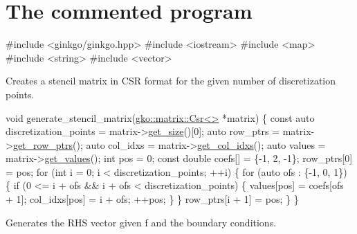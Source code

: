 \label{_CommProg}%
 \section*{The commented program}


\begin{DoxyCode}
\textcolor{preprocessor}{#include <ginkgo/ginkgo.hpp>}
\textcolor{preprocessor}{#include <iostream>}
\textcolor{preprocessor}{#include <map>}
\textcolor{preprocessor}{#include <string>}
\textcolor{preprocessor}{#include <vector>}
\end{DoxyCode}


Creates a stencil matrix in C\+SR format for the given number of discretization points.


\begin{DoxyCode}
\textcolor{keywordtype}{void} generate\_stencil\_matrix(\hyperlink{classgko_1_1matrix_1_1Csr}{gko::matrix::Csr<>} *matrix)
\{
    \textcolor{keyword}{const} \textcolor{keyword}{auto} discretization\_points = matrix->\hyperlink{classgko_1_1LinOp_a31b3c003388eb0b95393154f68c2b98d}{get\_size}()[0];
    \textcolor{keyword}{auto} row\_ptrs = matrix->\hyperlink{classgko_1_1matrix_1_1Csr_a068e5158cf282fa977f0a137f8cd7f03}{get\_row\_ptrs}();
    \textcolor{keyword}{auto} col\_idxs = matrix->\hyperlink{classgko_1_1matrix_1_1Csr_a81c6294177a1be4873804c8a85a9fc64}{get\_col\_idxs}();
    \textcolor{keyword}{auto} values = matrix->\hyperlink{classgko_1_1matrix_1_1Csr_a929b0a194e6aeb1252b8e6781d162e83}{get\_values}();
    \textcolor{keywordtype}{int} pos = 0;
    \textcolor{keyword}{const} \textcolor{keywordtype}{double} coefs[] = \{-1, 2, -1\};
    row\_ptrs[0] = pos;
    \textcolor{keywordflow}{for} (\textcolor{keywordtype}{int} i = 0; i < discretization\_points; ++i) \{
        \textcolor{keywordflow}{for} (\textcolor{keyword}{auto} ofs : \{-1, 0, 1\}) \{
            \textcolor{keywordflow}{if} (0 <= i + ofs && i + ofs < discretization\_points) \{
                values[pos] = coefs[ofs + 1];
                col\_idxs[pos] = i + ofs;
                ++pos;
            \}
        \}
        row\_ptrs[i + 1] = pos;
    \}
\}
\end{DoxyCode}


Generates the R\+HS vector given {\ttfamily f} and the boundary conditions.


